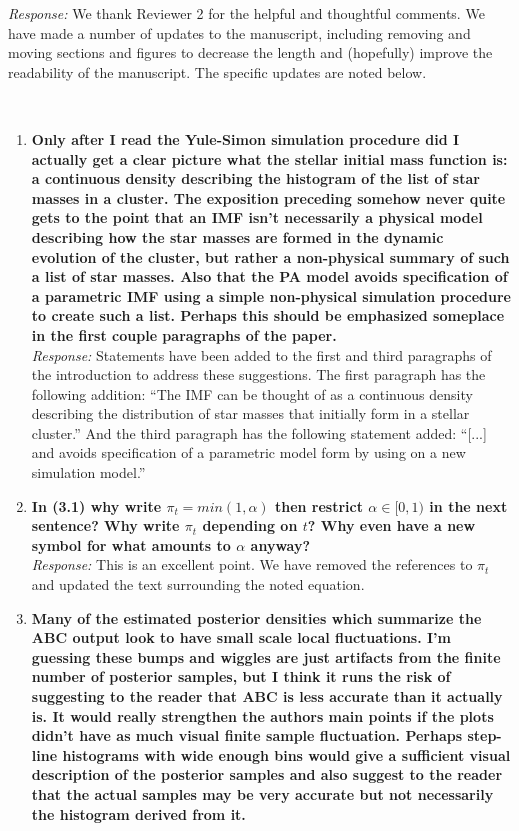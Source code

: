\documentclass[11pt, oneside]{article}   	%
\begin{document}
\noindent \emph{Response:} We thank Reviewer 2 for the helpful and thoughtful comments.  We have made a number of updates to the manuscript, including removing and moving sections and figures to decrease the length and (hopefully) improve the readability of the manuscript.  The specific updates are noted below.
\bigskip


\\

\begin{enumerate}
\item {\bf Only after I read the Yule-Simon simulation procedure did I actually get a clear picture what the stellar initial mass function is: a continuous density describing the histogram of the list of star masses in a cluster. The exposition preceding somehow never quite gets to the point that an IMF isn't necessarily a physical model describing how the star masses are formed in the dynamic evolution of the cluster, but rather a non-physical summary of such a list of star masses. Also that the PA model avoids specification of a parametric IMF using a simple non-physical simulation procedure to create such a list. Perhaps this should be emphasized someplace in the first couple paragraphs of the paper.
} \\
\noindent \emph{Response:} Statements have been added to the first and third paragraphs of the introduction to address these suggestions.  The first paragraph has the following addition:  ``The IMF can be thought of as a continuous density describing the distribution of star masses that initially form in a stellar cluster.'' And the third paragraph has the following statement added:  ``[...] and avoids specification of a parametric model form by using on a new simulation model.''
\bigskip

\item {\bf In (3.1) why write $\pi_t = min(1, \alpha)$  then restrict $\alpha \in [0, 1)$ in the next sentence? Why write $\pi_t$ depending on $t$? Why even have a new symbol for what amounts to $\alpha$ anyway?}\\
\noindent \emph{Response:} This is an excellent point.  We have removed the references to $\pi_t$ and updated the text surrounding the noted equation.
\bigskip

\item {\bf Many of the estimated posterior densities which summarize the ABC output look to have small scale local fluctuations. I'm guessing these bumps and wiggles are just artifacts from the finite number of posterior samples, but I think it runs the risk of suggesting to the reader that ABC is less accurate than it actually is. It would really strengthen the authors main points if the plots didn't have as much visual finite sample fluctuation. Perhaps step-line histograms with wide enough bins would give a sufficient visual description of the posterior samples and also suggest to the reader that the actual samples may be very accurate but not necessarily the histogram derived from it. \\

}
\end{enumerate}
\end{document}
